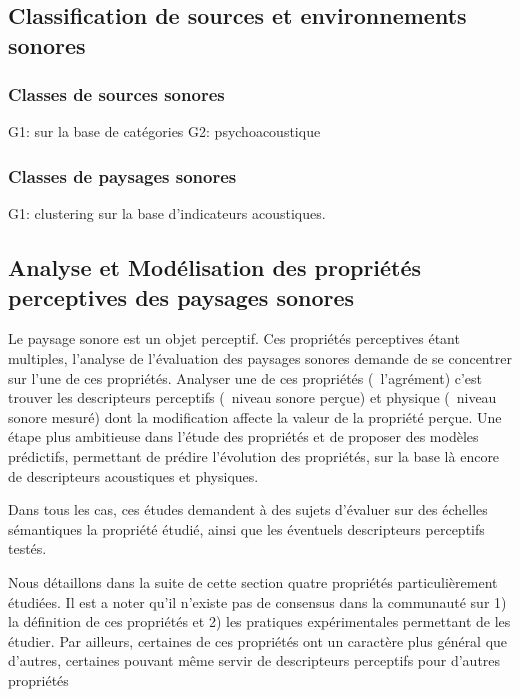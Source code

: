 \subsection{Classification de sources et environnements sonores}

\subsubsection{Classes de sources sonores}

G1: \citep{niessen2010categories,park14} sur la base de catégories
G2: \citep{yang2013psychoacoustical} psychoacoustique

\subsubsection{Classes de paysages sonores}

G1: \citep{rychtarikova2013soundscape,torija2013application} clustering sur la base d'indicateurs acoustiques.

\subsection{Analyse et Modélisation des propriétés perceptives des paysages sonores}
Le paysage sonore est un objet perceptif. Ces propriétés perceptives étant multiples, l'analyse de l'évaluation des paysages sonores demande de se concentrer sur l'une de ces propriétés. Analyser une de ces propriétés (\eg~l'agrément) c'est trouver les descripteurs perceptifs (\eg~niveau sonore perçue) et physique (\eg~niveau sonore mesuré) dont la modification affecte la valeur de la propriété perçue. Une étape plus ambitieuse dans l'étude des propriétés et de proposer des modèles prédictifs, permettant de prédire l’évolution des propriétés, sur la base là encore de descripteurs acoustiques et physiques.

Dans tous les cas, ces études demandent à des sujets d'évaluer sur des échelles sémantiques la propriété étudié, ainsi que les éventuels descripteurs perceptifs testés.

Nous détaillons dans la suite de cette section quatre propriétés particulièrement étudiées. Il est a noter qu'il n'existe pas de consensus dans la communauté sur 1) la définition de ces propriétés et 2) les pratiques expérimentales permettant de les étudier. Par ailleurs, certaines de ces propriétés ont un caractère plus général que d'autres, certaines pouvant même servir de descripteurs perceptifs pour d'autres propriétés

